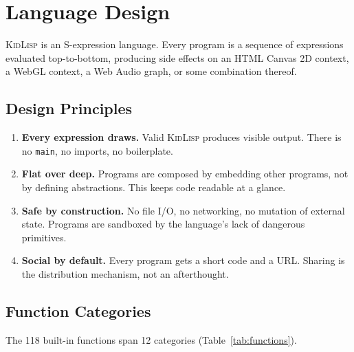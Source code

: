 \documentclass[10pt,letterpaper,twocolumn]{article}
\newcommand{\kidlisp}{\textsc{KidLisp}}
\begin{document}

\section{Language Design}
\label{sec:design}

\kidlisp{} is an S-expression language. Every program is a sequence of expressions evaluated top-to-bottom, producing side effects on an HTML Canvas 2D context, a WebGL context, a Web Audio graph, or some combination thereof.

\subsection{Design Principles}

\begin{enumerate}
  \item \textbf{Every expression draws.} Valid \kidlisp{} produces visible output. There is no \texttt{main}, no imports, no boilerplate.
  \item \textbf{Flat over deep.} Programs are composed by embedding other programs, not by defining abstractions. This keeps code readable at a glance.
  \item \textbf{Safe by construction.} No file I/O, no networking, no mutation of external state. Programs are sandboxed by the language's lack of dangerous primitives.
  \item \textbf{Social by default.} Every program gets a short code and a URL. Sharing is the distribution mechanism, not an afterthought.
\end{enumerate}

\subsection{Function Categories}

The 118 built-in functions span 12 categories (Table~\ref{tab:functions}).
\end{document}

